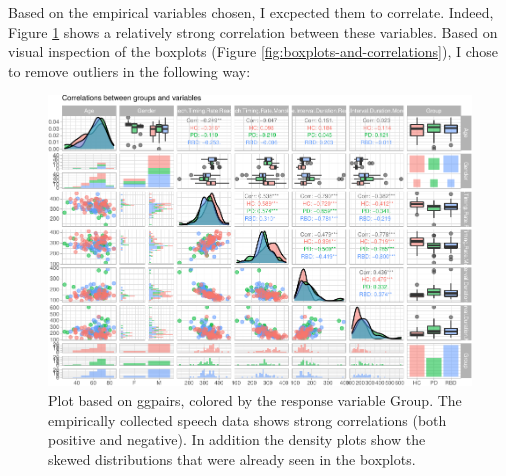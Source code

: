 \documentclass[
  english,
  doc,floatsintext]{apa6}
\newenvironment{Shaded}{\begin{snugshade}}{\end{snugshade}}
\newcommand{\DecValTok}[1]{\textcolor[rgb]{0.00,0.00,0.81}{#1}}
\newcommand{\NormalTok}[1]{#1}
\newcommand{\OtherTok}[1]{\textcolor[rgb]{0.56,0.35,0.01}{#1}}
\newcommand{\SpecialCharTok}[1]{\textcolor[rgb]{0.00,0.00,0.00}{#1}}
\newcommand{\StringTok}[1]{\textcolor[rgb]{0.31,0.60,0.02}{#1}}
\begin{document}
Based on the empirical variables chosen, I excpected them to correlate. Indeed, Figure \ref{fig:correlate-ggpairs-plot} shows
a relatively strong correlation between these variables. Based on visual inspection of the boxplots (Figure \ref{fig:boxplots-and-correlations}), I chose to remove outliers
in the following way:

\begin{figure}

{\centering \includegraphics{dap_report_anja_probst_files/figure-latex/correlate-ggpairs-plot-1} 

}

\caption{Plot based on ggpairs, colored by the response variable Group. The empirically collected speech data shows strong correlations (both positive and negative). In addition the density plots show the skewed distributions that were already seen in the boxplots.}\label{fig:correlate-ggpairs-plot}
\end{figure}

\begin{Shaded}
\end{Shaded}
\end{document}
